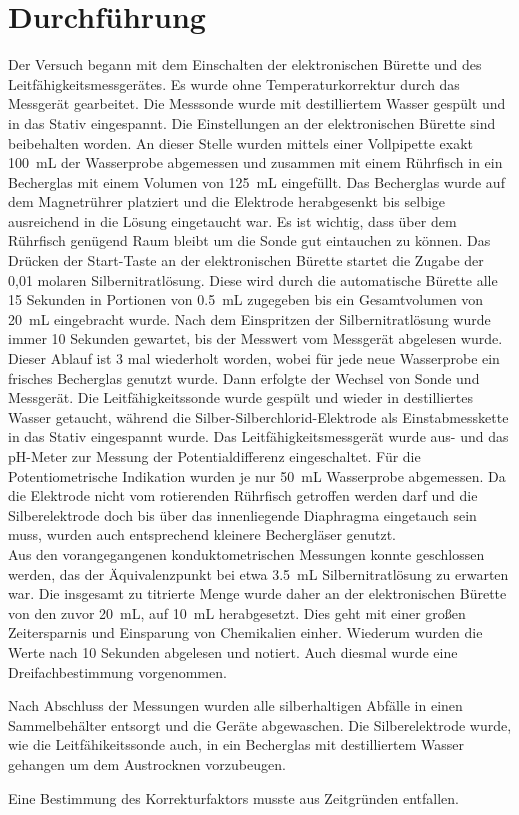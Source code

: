 \section{Durchführung}
\label{sec:durchfuerung}

Der Versuch begann mit dem Einschalten der elektronischen Bürette und des Leitfähigkeitsmessgerätes. Es wurde ohne Temperaturkorrektur durch das Messgerät gearbeitet. Die Messsonde wurde mit destilliertem Wasser gespült und in das Stativ eingespannt. Die Einstellungen an der elektronischen Bürette sind beibehalten worden. An dieser Stelle wurden mittels einer Vollpipette exakt \SI{100}{\milli\liter} der Wasserprobe abgemessen und zusammen mit einem Rührfisch in ein Becherglas mit einem Volumen von \SI{125}{\milli\liter} eingefüllt. Das Becherglas wurde auf dem Magnetrührer platziert und die Elektrode herabgesenkt bis selbige ausreichend in die Lösung eingetaucht war. Es ist wichtig, dass über dem Rührfisch genügend Raum bleibt um die Sonde gut eintauchen zu können. Das Drücken der Start-Taste an der elektronischen Bürette startet die Zugabe der 0,01 molaren Silbernitratlösung. Diese wird durch die automatische Bürette alle 15 Sekunden in Portionen von \SI{0,5}{\milli\liter} zugegeben bis ein Gesamtvolumen von \SI{20}{\milli\liter} eingebracht wurde. Nach dem Einspritzen der Silbernitratlösung wurde immer 10 Sekunden gewartet, bis der Messwert vom Messgerät abgelesen wurde. Dieser Ablauf ist 3 mal wiederholt worden, wobei für jede neue Wasserprobe ein frisches Becherglas genutzt wurde. Dann erfolgte der Wechsel von Sonde und Messgerät. Die Leitfähigkeitssonde wurde gespült und wieder in destilliertes Wasser getaucht, während die Silber-Silberchlorid-Elektrode als Einstabmesskette in das Stativ eingespannt wurde. Das Leitfähigkeitsmessgerät wurde aus- und das pH-Meter zur Messung der Potentialdifferenz eingeschaltet. Für die Potentiometrische Indikation wurden je nur \SI{50}{\milli\liter} Wasserprobe abgemessen. Da die Elektrode  nicht vom rotierenden Rührfisch getroffen werden darf und die Silberelektrode doch bis über das innenliegende Diaphragma eingetauch sein muss, wurden auch entsprechend kleinere Bechergläser genutzt. \\
Aus den vorangegangenen konduktometrischen Messungen konnte geschlossen werden, das der Äquivalenzpunkt bei etwa \SI{3,5}{\milli\liter} Silbernitratlösung zu erwarten war. Die insgesamt zu titrierte Menge wurde daher an der elektronischen Bürette von den zuvor \SI{20}{\milli\liter}, auf \SI{10}{\milli\liter} herabgesetzt. Dies geht mit einer großen Zeitersparnis und Einsparung von Chemikalien einher. Wiederum wurden die Werte nach 10 Sekunden abgelesen und notiert. Auch diesmal wurde eine Dreifachbestimmung vorgenommen.

Nach Abschluss der Messungen wurden alle silberhaltigen Abfälle in einen Sammelbehälter entsorgt und die Geräte abgewaschen. Die Silberelektrode wurde, wie die Leitfähikeitssonde auch, in ein Becherglas mit destilliertem Wasser gehangen um dem Austrocknen vorzubeugen.

Eine Bestimmung des Korrekturfaktors musste aus Zeitgründen entfallen.